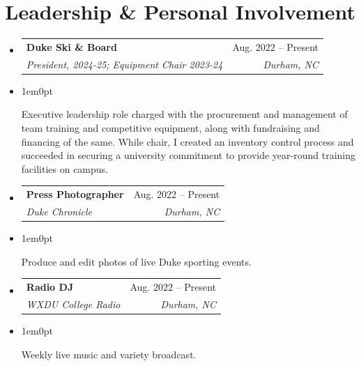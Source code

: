 \documentclass[letterpaper,11pt]{article}
\makeatletter
\newcommand{\experienceDescription}[1]{
  \item{
    \begin{adjustwidth}{1em}{0pt} 
      #1\vspace{-8pt}
    \end{adjustwidth}
  }%
}
\newcommand{\resumeSubheading}[4]{
  \vspace{-2pt}\item
    \begin{tabular*}{0.97\textwidth}[t]{l@{\extracolsep{\fill}}r}
      \textbf{#1} & #2 \\
      \hspace{1em}\textit{\small#3} & \textit{\small #4} \\
    \end{tabular*}\vspace{-5 pt}
}
\newcommand{\resumeSubHeadingListStart}{
    \begin{itemize}[leftmargin=0.15in, label={}]
}
\newcommand{\resumeSubHeadingListEnd}{
    \end{itemize}
}
\makeatother
\begin{document}
\section{Leadership \& Personal Involvement}
  \resumeSubHeadingListStart
    \resumeSubheading{Duke Ski \& Board}{Aug. 2022 -- Present}{President, 2024-25; Equipment Chair 2023-24}{Durham, NC}
      \experienceDescription{
        Executive leadership role charged with the procurement and management of team training and competitive equipment, along with fundraising and financing of the same.  While chair, I created an inventory control process and succeeded in securing a university commitment to provide year-round training facilities on campus.
      }
    \medskip
    \resumeSubheading{Press Photographer}{Aug. 2022 -- Present}{Duke Chronicle}{Durham, NC}
      \experienceDescription{
        Produce and edit photos of live Duke sporting events.
      }
    \medskip
    \resumeSubheading{Radio DJ}{Aug. 2022 -- Present}{WXDU College Radio}{Durham, NC}
      \experienceDescription{
        Weekly live music and variety broadcast.
      }
  \resumeSubHeadingListEnd
\end{document}
